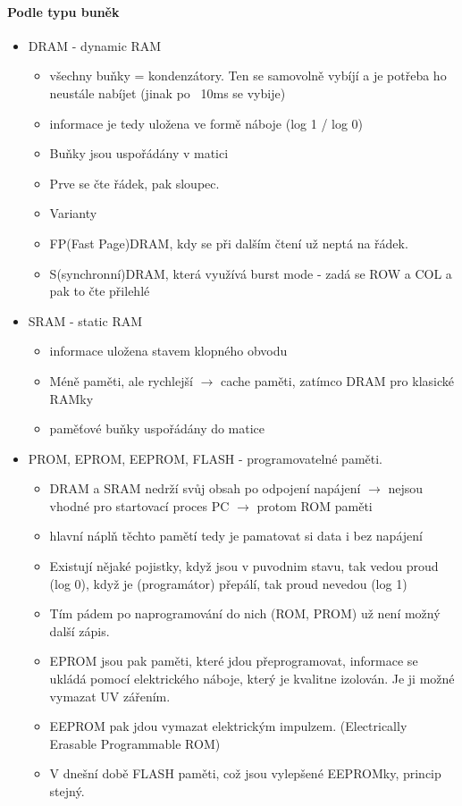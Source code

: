 \documentclass[10pt,a4paper]{article}
\begin{document}
\paragraph{Podle typu buněk}
\begin{itemize}
\item DRAM - dynamic RAM
\begin{itemize}
\item všechny buňky = kondenzátory. Ten se samovolně vybíjí a je potřeba ho neustále nabíjet (jinak po ~10ms se vybije)
\item informace je tedy uložena ve formě náboje (log 1 / log 0)
\item Buňky jsou uspořádány v matici
\item Prve se čte řádek, pak sloupec.
\item Varianty
\item FP(Fast Page)DRAM, kdy se při dalším čtení už neptá na řádek.
\item S(synchronní)DRAM, která využívá burst mode - zadá se ROW a COL a pak to čte přilehlé
\end{itemize}
\item SRAM - static RAM
\begin{itemize}
\item informace uložena stavem klopného obvodu
\item Méně paměti, ale rychlejší $\rightarrow$ cache paměti, zatímco DRAM pro klasické RAMky
\item paměťové buňky uspořádány do matice
\end{itemize}
\item PROM, EPROM, EEPROM, FLASH - programovatelné paměti.
\begin{itemize}
\item DRAM a SRAM nedrží svůj obsah po odpojení napájení $\rightarrow$ nejsou vhodné pro startovací proces PC $\rightarrow$ protom ROM paměti
\item hlavní náplň těchto pamětí tedy je pamatovat si data i bez napájení
\item Existují nějaké pojistky, když jsou v puvodnim stavu, tak vedou proud (log 0), když je (programátor) přepálí, tak proud nevedou (log 1)
\item Tím pádem po naprogramování do nich (ROM, PROM) už není možný další zápis.
\item EPROM jsou pak paměti, které jdou přeprogramovat, informace se ukládá pomocí elektrického náboje, který je kvalitne izolován. Je ji možné vymazat UV zářením.
\item EEPROM pak jdou vymazat elektrickým impulzem. (Electrically Erasable Programmable ROM)
\item V dnešní době FLASH paměti, což jsou vylepšené EEPROMky, princip stejný.
\end{itemize}
\end{itemize}
\end{document}
